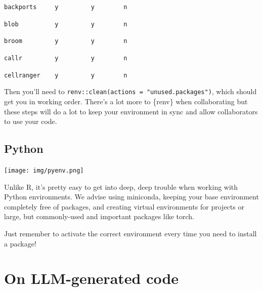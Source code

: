 \documentclass[
  letterpaper,
  DIV=11,
  numbers=noendperiod]{scrreprt}
\begin{document}
\begin{tcolorbox}
\texttt{backports\ \ \ \ \ y\ \ \ \ \ \ \ \ \ y\ \ \ \ \ \ \ \ n}

\texttt{blob\ \ \ \ \ \ \ \ \ \ y\ \ \ \ \ \ \ \ \ y\ \ \ \ \ \ \ \ n}

\texttt{broom\ \ \ \ \ \ \ \ \ y\ \ \ \ \ \ \ \ \ y\ \ \ \ \ \ \ \ n}

\texttt{callr\ \ \ \ \ \ \ \ \ y\ \ \ \ \ \ \ \ \ y\ \ \ \ \ \ \ \ n}

\texttt{cellranger\ \ \ \ y\ \ \ \ \ \ \ \ \ y\ \ \ \ \ \ \ \ n}

Then you'll need to \texttt{renv::clean(actions\ =\ "unused.packages")},
which should get you in working order. There's a lot more to \{renv\}
when collaborating but these steps will do a lot to keep your
environment in sync and allow collaborators to use your code.

\end{tcolorbox}

\subsection{Python}\label{python-1}

\texttt{[image: img/pyenv.png]}

Unlike R, it's pretty easy to get into deep, deep trouble when working
with Python environments. We advise using miniconda, keeping your base
environment completely free of packages, and creating virtual
environments for projects or large, but commonly-used and important
packages like torch.

\begin{tcolorbox}[enhanced jigsaw, opacitybacktitle=0.6, breakable, title=\textcolor{quarto-callout-tip-color}{\faLightbulb}\hspace{0.5em}{Tip}, arc=.35mm, colframe=quarto-callout-tip-color-frame, colbacktitle=quarto-callout-tip-color!10!white, left=2mm, bottomrule=.15mm, opacityback=0, toprule=.15mm, bottomtitle=1mm, toptitle=1mm, titlerule=0mm, leftrule=.75mm, colback=white, rightrule=.15mm, coltitle=black]

Just remember to activate the correct environment every time you need to
install a package!

\end{tcolorbox}

\section{On LLM-generated code}\label{on-llm-generated-code}
\end{document}
